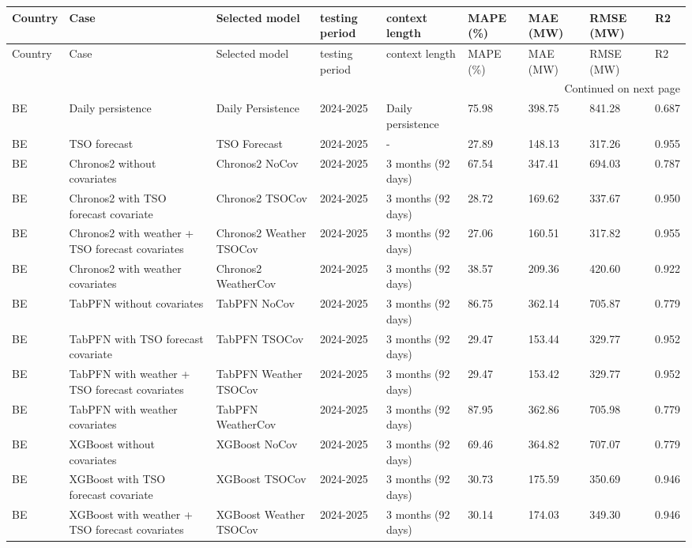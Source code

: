 \begin{longtable}{lllllllll}
\toprule
Country & Case & Selected model & testing period & context length & MAPE (\%) & MAE (MW) & RMSE (MW) & R2 \\
\midrule
\endfirsthead
\toprule
Country & Case & Selected model & testing period & context length & MAPE (\%) & MAE (MW) & RMSE (MW) & R2 \\
\midrule
\endhead
\midrule
\multicolumn{9}{r}{Continued on next page} \\
\midrule
\endfoot
\bottomrule
\endlastfoot
BE & Daily persistence & Daily Persistence & 2024-2025 & Daily persistence & 75.98 & 398.75 & 841.28 & 0.687 \\
BE & TSO forecast & TSO Forecast & 2024-2025 & - & 27.89 & 148.13 & 317.26 & 0.955 \\
BE & Chronos2 without covariates & Chronos2 NoCov & 2024-2025 & 3 months (92 days) & 67.54 & 347.41 & 694.03 & 0.787 \\
BE & Chronos2 with TSO forecast covariate & Chronos2 TSOCov & 2024-2025 & 3 months (92 days) & 28.72 & 169.62 & 337.67 & 0.950 \\
BE & Chronos2 with weather + TSO forecast covariates & Chronos2 Weather TSOCov & 2024-2025 & 3 months (92 days) & 27.06 & 160.51 & 317.82 & 0.955 \\
BE & Chronos2 with weather covariates & Chronos2 WeatherCov & 2024-2025 & 3 months (92 days) & 38.57 & 209.36 & 420.60 & 0.922 \\
BE & TabPFN without covariates & TabPFN NoCov & 2024-2025 & 3 months (92 days) & 86.75 & 362.14 & 705.87 & 0.779 \\
BE & TabPFN with TSO forecast covariate & TabPFN TSOCov & 2024-2025 & 3 months (92 days) & 29.47 & 153.44 & 329.77 & 0.952 \\
BE & TabPFN with weather + TSO forecast covariates & TabPFN Weather TSOCov & 2024-2025 & 3 months (92 days) & 29.47 & 153.42 & 329.77 & 0.952 \\
BE & TabPFN with weather covariates & TabPFN WeatherCov & 2024-2025 & 3 months (92 days) & 87.95 & 362.86 & 705.98 & 0.779 \\
BE & XGBoost without covariates & XGBoost NoCov & 2024-2025 & 3 months (92 days) & 69.46 & 364.82 & 707.07 & 0.779 \\
BE & XGBoost with TSO forecast covariate & XGBoost TSOCov & 2024-2025 & 3 months (92 days) & 30.73 & 175.59 & 350.69 & 0.946 \\
BE & XGBoost with weather + TSO forecast covariates & XGBoost Weather TSOCov & 2024-2025 & 3 months (92 days) & 30.14 & 174.03 & 349.30 & 0.946 \\

\end{longtable}
